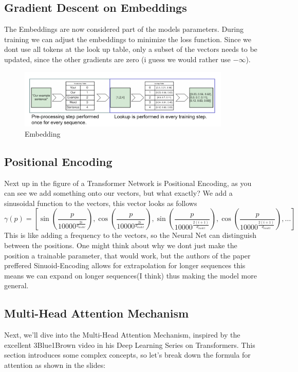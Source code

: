 \documentclass[a4paper]{article}
\begin{document}
    \subsection{Gradient Descent on Embeddings}
    The Embeddings are now considered part of the models parameters. During training we can adjust the embeddings to minimize the loss function. Since we dont use all tokens at the look up table, only a subset of the vectors needs to be updated, since the other gradients are zero (i guess we would rather use $-\infty$).
\begin{figure}[h]
    \centering
    \includegraphics[width=0.9\textwidth]{images/input_embeddingg.png}
    \caption{Embedding}
    \label{fig:Embedding}
\end{figure}    
\subsection{Positional Encoding}
Next up in the figure of a Transformer Network is Positional Encoding, as you can see we add something onto our vectors, but what exactly? We add a sinusoidal function to the vectors, this vector looks as follows \[
\gamma(p) = \left[
\sin \left( \frac{p}{10000^{\frac{2i}{d_{model}}}} \right), 
\cos \left( \frac{p}{10000^{\frac{2i}{d_{model}}}} \right), 
\sin \left( \frac{p}{10000^{\frac{2(i+1)}{d_{model}}}} \right), 
\cos \left( \frac{p}{10000^{\frac{2(i+1)}{d_{model}}}} \right), 
\ldots
\right]
\]
This is like adding a frequency to the vectors, so the Neural Net can distinguish between the positions. One might think about why we dont just make the position a trainable parameter, that would work, but the authors of the paper preffered Sinuoid-Encoding allows for extrapolation for longer sequences this means we can expand on longer sequences(I think) thus making 
the model more general.

\subsection{Multi-Head Attention Mechanism}

Next, we'll dive into the Multi-Head Attention Mechanism, inspired by the excellent 3Blue1Brown video in his Deep Learning Series on Transformers. This section introduces some complex concepts, so let's break down the formula for attention as shown in the slides:
\end{document}

